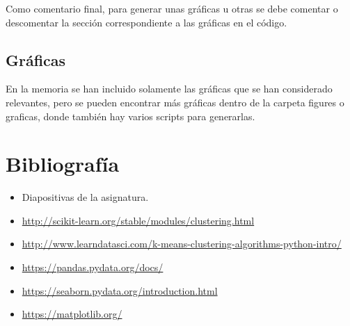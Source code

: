 \documentclass[twoside,openright,titlepage,numbers=noenddot,openany,headinclude,footinclude=true,
cleardoublepage=empty,abstractoff,BCOR=5mm,paper=a4,fontsize=12pt,main=spanish]{scrreprt}
\begin{document}
Como comentario final, para generar unas gráficas u otras se debe comentar o descomentar la sección correspondiente a las gráficas en el código.

\section{Gráficas}
En la memoria se han incluido solamente las gráficas que se han considerado relevantes, pero se pueden encontrar más gráficas dentro de la carpeta figures o graficas, donde también hay varios scripts para generarlas.


\chapter{Bibliografía}
\begin{itemize}
\item Diapositivas de la asignatura.
\item \href{http://scikit-learn.org/stable/modules/clustering.html}{http://scikit-learn.org/stable/modules/clustering.html}
\item \href{http://www.learndatasci.com/k-means-clustering-algorithms-python-intro/}{http://www.learndatasci.com/k-means-clustering-algorithms-python-intro/}
\item \href{https://pandas.pydata.org/docs/}{https://pandas.pydata.org/docs/}
\item \href{https://seaborn.pydata.org/introduction.html}{https://seaborn.pydata.org/introduction.html}
\item \href{https://matplotlib.org/}{https://matplotlib.org/}
\end{itemize}

%
\end{document}

